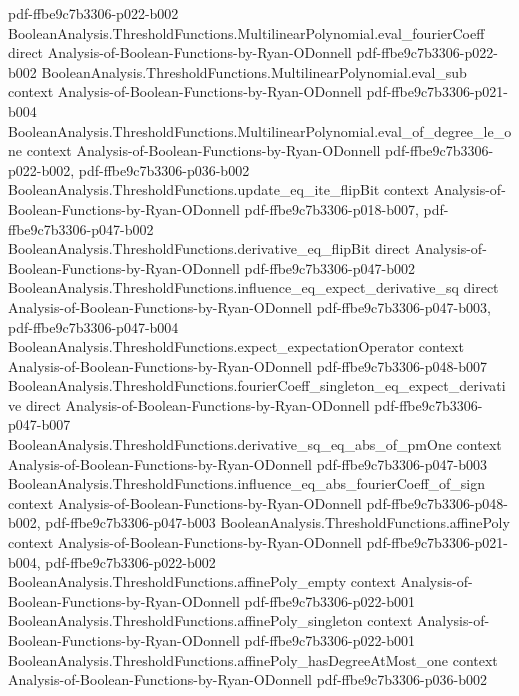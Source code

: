 \begin{theorem}
  {pdf-ffbe9c7b3306-p022-b002}
\proofstep
  {BooleanAnalysis.ThresholdFunctions.MultilinearPolynomial.eval_fourierCoeff}
  {direct}
  {Analysis-of-Boolean-Functions-by-Ryan-ODonnell}
  {pdf-ffbe9c7b3306-p022-b002}
\proofstep
  {BooleanAnalysis.ThresholdFunctions.MultilinearPolynomial.eval_sub}
  {context}
  {Analysis-of-Boolean-Functions-by-Ryan-ODonnell}
  {pdf-ffbe9c7b3306-p021-b004}
\proofstep
  {BooleanAnalysis.ThresholdFunctions.MultilinearPolynomial.eval_of_degree_le_one}
  {context}
  {Analysis-of-Boolean-Functions-by-Ryan-ODonnell}
  {pdf-ffbe9c7b3306-p022-b002,
    pdf-ffbe9c7b3306-p036-b002}
\proofstep
  {BooleanAnalysis.ThresholdFunctions.update_eq_ite_flipBit}
  {context}
  {Analysis-of-Boolean-Functions-by-Ryan-ODonnell}
  {pdf-ffbe9c7b3306-p018-b007,
    pdf-ffbe9c7b3306-p047-b002}
\proofstep
  {BooleanAnalysis.ThresholdFunctions.derivative_eq_flipBit}
  {direct}
  {Analysis-of-Boolean-Functions-by-Ryan-ODonnell}
  {pdf-ffbe9c7b3306-p047-b002}
\proofstep
  {BooleanAnalysis.ThresholdFunctions.influence_eq_expect_derivative_sq}
  {direct}
  {Analysis-of-Boolean-Functions-by-Ryan-ODonnell}
  {pdf-ffbe9c7b3306-p047-b003,
    pdf-ffbe9c7b3306-p047-b004}
\proofstep
  {BooleanAnalysis.ThresholdFunctions.expect_expectationOperator}
  {context}
  {Analysis-of-Boolean-Functions-by-Ryan-ODonnell}
  {pdf-ffbe9c7b3306-p048-b007}
\proofstep
  {BooleanAnalysis.ThresholdFunctions.fourierCoeff_singleton_eq_expect_derivative}
  {direct}
  {Analysis-of-Boolean-Functions-by-Ryan-ODonnell}
  {pdf-ffbe9c7b3306-p047-b007}
\proofstep
  {BooleanAnalysis.ThresholdFunctions.derivative_sq_eq_abs_of_pmOne}
  {context}
  {Analysis-of-Boolean-Functions-by-Ryan-ODonnell}
  {pdf-ffbe9c7b3306-p047-b003}
\proofstep
  {BooleanAnalysis.ThresholdFunctions.influence_eq_abs_fourierCoeff_of_sign}
  {context}
  {Analysis-of-Boolean-Functions-by-Ryan-ODonnell}
  {pdf-ffbe9c7b3306-p048-b002,
    pdf-ffbe9c7b3306-p047-b003}
\proofstep
  {BooleanAnalysis.ThresholdFunctions.affinePoly}
  {context}
  {Analysis-of-Boolean-Functions-by-Ryan-ODonnell}
  {pdf-ffbe9c7b3306-p021-b004,
    pdf-ffbe9c7b3306-p022-b002}
\proofstep
  {BooleanAnalysis.ThresholdFunctions.affinePoly_empty}
  {context}
  {Analysis-of-Boolean-Functions-by-Ryan-ODonnell}
  {pdf-ffbe9c7b3306-p022-b001}
\proofstep
  {BooleanAnalysis.ThresholdFunctions.affinePoly_singleton}
  {context}
  {Analysis-of-Boolean-Functions-by-Ryan-ODonnell}
  {pdf-ffbe9c7b3306-p022-b001}
\proofstep
  {BooleanAnalysis.ThresholdFunctions.affinePoly_hasDegreeAtMost_one}
  {context}
  {Analysis-of-Boolean-Functions-by-Ryan-ODonnell}
  {pdf-ffbe9c7b3306-p036-b002}

\end{theorem}
